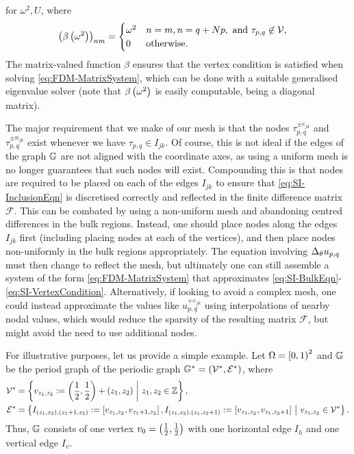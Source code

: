 for $\omega^2, U$, where 
\begin{align*}
	\left( \beta\left( \omega^2 \right) \right)_{nm} &= 
	\begin{cases}
 		\omega^2 & n=m, n=q + Np, \text{ and } \tau_{p,q}\not\in\mathcal{V}, \\
 		0 & \text{otherwise. }
	\end{cases}
\end{align*}
The matrix-valued function $\beta$ ensures that the vertex condition is satisfied when solving \eqref{eq:FDM-MatrixSystem}, which can be done with a suitable generalised eigenvalue solver (note that $\beta\left( \omega^2 \right)$ is easily computable, being a diagonal matrix).

The major requirement that we make of our mesh is that the nodes $\tau_{p,q}^{\pm e_{jk}}$ and $\tau_{p,q}^{\pm n_{jk}}$ exist whenever we have $\tau_{p,q}\in I_{jk}$.
Of course, this is not ideal if the edges of the graph $\mathbb{G}$ are not aligned with the coordinate axes, as using a uniform mesh is no longer guarantees that such nodes will exist.
Compounding this is that nodes are required to be placed on each of the edges $I_{jk}$ to ensure that \eqref{eq:SI-InclusionEqn} is discretised correctly and reflected in the finite difference matrix $\mathcal{F}$.
This can be combated by using a non-uniform mesh and abandoning centred differences in the bulk regions.
Instead, one should place nodes along the edges $I_{jk}$ first (including placing nodes at each of the vertices), and then place nodes non-uniformly in the bulk regions appropriately.
The equation involving $\Delta_{\theta}u_{p,q}$ must then change to reflect the mesh, but ultimately one can still assemble a system of the form \eqref{eq:FDM-MatrixSystem} that approximates \eqref{eq:SI-BulkEqn}-\eqref{eq:SI-VertexCondition}.
Alternatively, if looking to avoid a complex mesh, one could instead approximate the values like $u_{p,q}^{+e_{jk}}$ using interpolations of nearby nodal values, which would reduce the sparsity of the resulting matrix $\mathcal{F}$, but might avoid the need to use additional nodes.

For illustrative purposes, let us provide a simple example.
Let $\Omega=\left[0,1\right)^2$ and $\mathbb{G}$ be the period graph of the periodic graph $\mathbb{G}^*=\left( \mathcal{V}^*,\mathcal{E}^* \right)$, where
\begin{align*}
	\mathcal{V}^* &= \left\{  v_{z_1,z_2} := \left( \frac{1}{2},\frac{1}{2} \right) + \left( z_1,z_2 \right) \ \middle\vert \  z_1,z_2\in\mathbb{Z}  \right\}, \\
	\mathcal{E}^* &= \left\{  I_{(z_1,z_2),(z_1+1,z_2)} := \left[  v_{z_1,z_2}, v_{z_1+1,z_2}  \right], I_{(z_1,z_2),(z_1,z_2+1)} := \left[  v_{z_1,z_2}, v_{z_1,z_2+1}  \right] \ \middle\vert \  v_{z_1,z_2}\in\mathcal{V}^*  \right\}.
\end{align*}
Thus, $\mathbb{G}$ consists of one vertex $v_0=\left( \frac{1}{2},\frac{1}{2} \right)$ with one horizontal edge $I_h$ and one vertical edge $I_v$.

